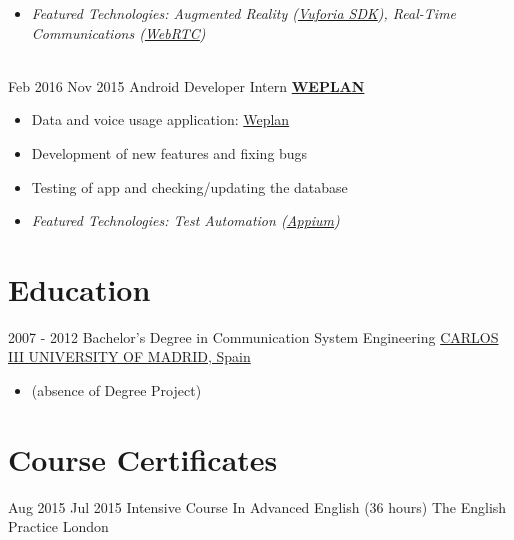 \documentclass[letterpaper]{twentysecondcv} %
\begin{document}
\begin{twenty}
{{\begin{itemize}
		\item \textit{Featured Technologies: {Augmented Reality (\href{https://www.vuforia.com/}{Vuforia SDK})}, Real-Time Communications (\href{https://webrtc.org/}{WebRTC})}
    \end{itemize}}
        }
     \\
     \twentyitem
   		{Feb 2016}
		{Nov 2015}
        {Android Developer Intern}
        {\href{http://weplan-app.com/}{\textbf{WEPLAN}}}
        {}
        {
        \begin{itemize}
        \item Data and voice usage application: \href{https://play.google.com/store/apps/details?id=com.cumberland.tutarifa&hl=en}{Weplan}
        \item Development of new features and fixing bugs
        \item Testing of app and checking/updating the database
        \item \textit{Featured Technologies: Test Automation (\href{https://play.google.com/store/apps/details?id=com.cumberland.tutarifa&hl=en}{Appium})} 
    \end{itemize}
    	}
        
\end{twenty}

\section{Education}

\begin{twenty} %
	\twentyitem
    	{2007 - 2012}
        {}
        {Bachelor's Degree in Communication System Engineering}
        \newline
       {\href{https://www.uc3m.es/Home}{CARLOS III UNIVERSITY OF MADRID, Spain}}
       {\begin{itemize}
       \item (absence of Degree Project)
       \end{itemize}}
        {}
        {}
\end{twenty}

\section{Course Certificates}
\begin{twenty}
	\twentyitem
    	{Aug 2015}
		{Jul 2015}
        {Intensive Course In Advanced English (36 hours)}
        {The English Practice}
        {}
        {London}
\end{twenty}
\end{document}
